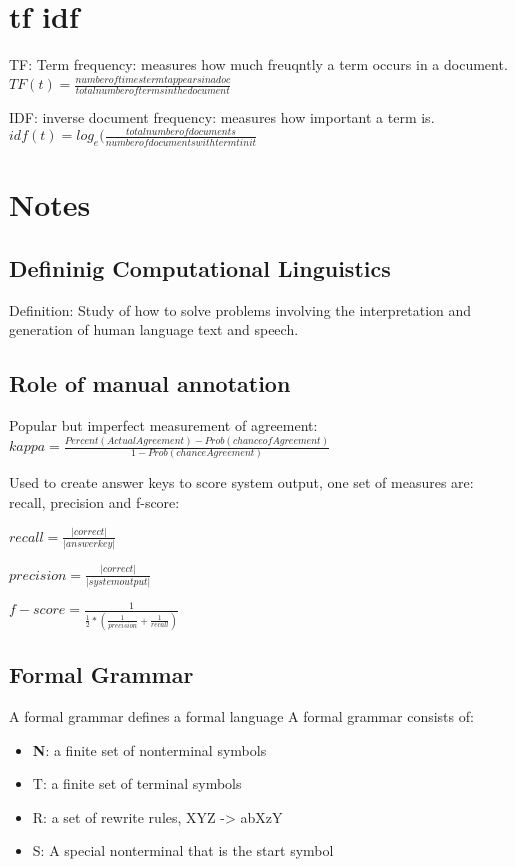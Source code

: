 \documentclass[a4paper]{article}
\begin{document}
\section{tf idf}
\par{TF: Term frequency: measures how much freuqntly a term occurs in a document. $TF(t) = \frac{number of times term t appears in a doc}{total number of terms in the document}$}
\par{IDF: inverse document frequency: measures how important a term is.  $idf(t) = log_e(\frac{total number of documents}{number of documents with term t in it}$}


\section{Notes}
\subsection{Defininig Computational Linguistics}
\par{Definition: Study of how to solve problems involving the interpretation and generation of human language text and speech.}
\subsection{Role of manual annotation}
\par{Popular but imperfect measurement of agreement: $kappa = \frac{Percent(Actual Agreement) - Prob(chance of Agreement)}{1-Prob(chance Agreement)}$}
\par{Used to create answer keys to score system output, one  set of measures are: recall, precision and f-score: }
\par{$recall = \frac{|correct|}{|answer key|}$}
\par{$precision = \frac{|correct|}{|system output|}$}
\par{$f-score = \frac{1}{\frac{1}{2} * ( \frac{1}{precision} + \frac{1}{recall}  ) }$}

\subsection{Formal Grammar}
\par{A formal grammar defines a formal language}
A formal grammar consists of:
\begin{itemize}
\item \textbf{N}: a finite set of nonterminal symbols
\item T: a finite set of terminal symbols
\item R: a set of rewrite rules, XYZ -> abXzY
\item S: A special nonterminal that is the start symbol
\end{itemize}
\end{document}
